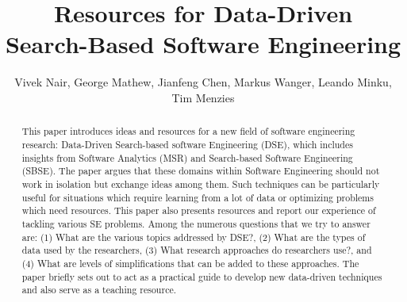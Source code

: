 \documentclass[table, xcdraw, sigconf,review, anonymous]{acmart}
\begin{document}
\title{
Resources for Data-Driven \\Search-Based Software Engineering}

\author{Vivek Nair, George Mathew, Jianfeng Chen, Markus Wanger, Leando Minku, Tim Menzies}
\email{}


\begin{abstract}
This paper introduces ideas and resources for a new field of software engineering research: Data-Driven Search-based software Engineering (DSE), which includes insights from Software Analytics (MSR) and Search-based Software Engineering (SBSE). The paper argues that these domains within Software Engineering should not work in isolation but exchange ideas among them. Such techniques can be particularly useful for situations which require learning from a lot of data or optimizing problems which need resources. This paper also presents resources and report our experience of tackling various SE problems.  Among the numerous questions that we try to answer are: (1) What are the various topics addressed by DSE?, (2) What are the types of data used by the researchers, (3) What research approaches do researchers use?, and  (4) What are levels of simplifications that can be added to these approaches. The paper briefly sets out to act as a practical guide to develop new data-driven techniques and also serve as a teaching resource.
\end{abstract}

%
%
\end{document}
